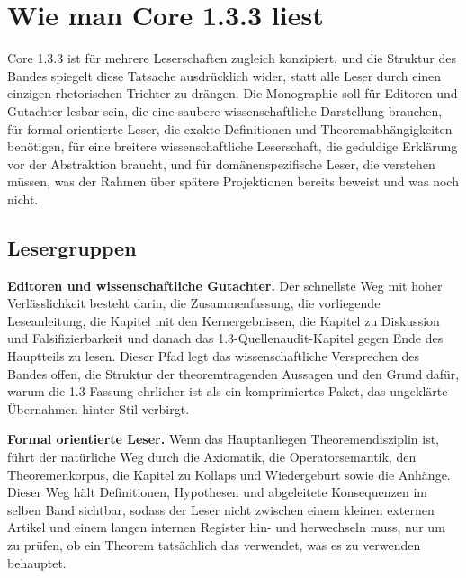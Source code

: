 \section{Wie man Core 1.3.3 liest}

Core 1.3.3 ist für mehrere Leserschaften zugleich konzipiert, und die Struktur des Bandes spiegelt
diese Tatsache ausdrücklich wider, statt alle Leser durch einen einzigen rhetorischen Trichter
zu drängen.
Die Monographie soll für Editoren und Gutachter lesbar sein, die eine saubere wissenschaftliche
Darstellung brauchen, für formal orientierte Leser, die exakte Definitionen und
Theoremabhängigkeiten benötigen, für eine breitere wissenschaftliche Leserschaft, die geduldige
Erklärung vor der Abstraktion braucht, und für domänenspezifische Leser, die verstehen müssen,
was der Rahmen über spätere Projektionen bereits beweist und was noch nicht.

\subsection{Lesergruppen}

\textbf{Editoren und wissenschaftliche Gutachter.}
Der schnellste Weg mit hoher Verlässlichkeit besteht darin, die Zusammenfassung, die vorliegende
Leseanleitung, die Kapitel mit den Kernergebnissen, die Kapitel zu Diskussion und
Falsifizierbarkeit und danach das 1.3-Quellenaudit-Kapitel gegen Ende des Hauptteils zu lesen.
Dieser Pfad legt das wissenschaftliche Versprechen des Bandes offen, die Struktur der
theoremtragenden Aussagen und den Grund dafür, warum die 1.3-Fassung ehrlicher ist als ein
komprimiertes Paket, das ungeklärte Übernahmen hinter Stil verbirgt.

\textbf{Formal orientierte Leser.}
Wenn das Hauptanliegen Theoremendisziplin ist, führt der natürliche Weg durch die Axiomatik, die
Operatorsemantik, den Theoremenkorpus, die Kapitel zu Kollaps und Wiedergeburt sowie die Anhänge.
Dieser Weg hält Definitionen, Hypothesen und abgeleitete Konsequenzen im selben Band sichtbar,
sodass der Leser nicht zwischen einem kleinen externen Artikel und einem langen internen Register
hin- und herwechseln muss, nur um zu prüfen, ob ein Theorem tatsächlich das verwendet, was es zu
verwenden behauptet.

